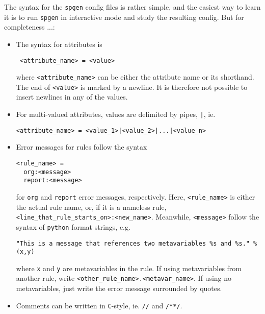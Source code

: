 \clearpage
\noindent The syntax for the \texttt{spgen} config files is rather simple, and the easiest way to learn it is to run \texttt{spgen} in interactive mode and study the resulting config. But for completeness ...:

\begin{itemize}
\item The syntax for attributes is
\begin{verbatim}
 <attribute_name> = <value>
\end{verbatim}
where \texttt{<attribute\_name>} can be either the attribute name or its shorthand. The end of \texttt{<value>} is marked by a newline. It is therefore not possible to insert newlines in any of the values.
\item For multi-valued attributes, values are delimited by pipes, \texttt{|}, ie.
\begin{verbatim}
<attribute_name> = <value_1>|<value_2>|...|<value_n>
\end{verbatim}
\item Error messages for rules follow the syntax
\begin{verbatim}
<rule_name> =
  org:<message>
  report:<message>
\end{verbatim}
for \texttt{org} and \texttt{report} error messages, respectively. Here, \texttt{<rule\_name>} is either the actual rule name, or, if it is a nameless rule, \texttt{<line\_that\_rule\_starts\_on>:<new\_name>}.\newline
Meanwhile, \texttt{<message>} follow the syntax of \texttt{python} format strings, e.g.
\begin{verbatim}
"This is a message that references two metavariables %s and %s." % (x,y)
\end{verbatim}
where \texttt{x} and \texttt{y} are metavariables in the rule. If using metavariables from another rule, write \texttt{<other\_rule\_name>.<metavar\_name>}. If using no metavariables, just write the error message surrounded by quotes.
\item Comments can be written in \texttt{C}-style, ie. \texttt{//} and \texttt{/**/}.

\end{itemize}
\bigskip

